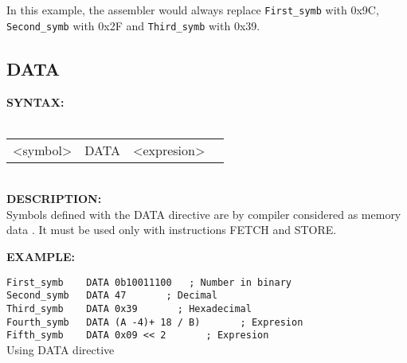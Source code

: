                 In this example, the assembler would always replace {\color{highlight_symbol}\verb'First_symb'} with 0x9C,
                {\color{highlight_symbol}\verb'Second_symb'} with 0x2F and {\color{highlight_symbol}\verb'Third_symb'} with 0x39.



                \subsection{DATA}
                \textbf{SYNTAX:}\\
                                \\ {
                                        \texttt{}
                                        \begin{tabular}[h!]{llll}
                                        { \color{highlight_symbol} <symbol> }  &
                                        { \color{highlight_directive} DATA } &
                                        { \color{highlight_constant} <expresion> } & { \color{highlight_comment}  }\\
                                        \end{tabular}
                                }
                                \\
                \textbf{DESCRIPTION:}\\
               Symbols defined with the DATA directive are by compiler considered as memory data . It must be used only with instructions FETCH and STORE.

                \textbf{EXAMPLE:}\\
                \begin{code}[h!]
                            {\color{highlight_constant}\verb'First_symb'}\verb'    '{\color{highlight_directive}\verb'DATA'}\verb' '{\color{highlight_bin}\verb'0b10011100'}\verb'   '{\color{highlight_comment}\verb'; Number in binary'}\\
                            {\color{highlight_constant}\verb'Second_symb'}\verb'   '{\color{highlight_directive}\verb'DATA'}\verb' '{\color{highlight_oct}\verb'47'}\verb'       '{\color{highlight_comment}\verb'; Decimal'}\\
                            {\color{highlight_constant}\verb'Third_symb'}\verb'    '{\color{highlight_directive}\verb'DATA'}\verb' '{\color{highlight_dec}\verb'0x39'}\verb'       '{\color{highlight_comment}\verb'; Hexadecimal'}\\
                            {\color{highlight_constant}\verb'Fourth_symb'}\verb'   '{\color{highlight_directive}\verb'DATA'}\verb' '{\color{highlight_dec}\verb'(A -4)+ 18 / B)'}\verb'       '{\color{highlight_comment}\verb'; Expresion'}\\
                            {\color{highlight_constant}\verb'Fifth_symb'}\verb'    '{\color{highlight_directive}\verb'DATA'}\verb' '{\color{highlight_dec}\verb'0x09 << 2'}\verb'       '{\color{highlight_comment}\verb'; Expresion'}\\
              \caption{Using DATA directive}
                \end{code}

